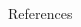 \documentclass{beamer}
\begin{document}




\begin{frame}{References}
	\begin{thebibliography}{2}
  


	\end{thebibliography}
\end{frame}

\end{document}
